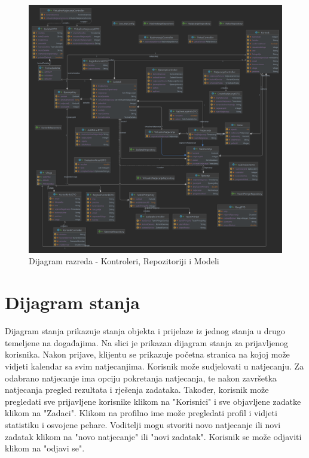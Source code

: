 \begin{figure}[H]
	\includegraphics[scale=0.15]{dijagrami/apiDiagram.png}
	\centering
	\caption{Dijagram razreda - Kontroleri, Repozitoriji i Modeli}
	\label{fig:dijagramRazreda2}
\end{figure}

%
%
%
%
\eject
%
\section{Dijagram stanja}


%

Dijagram stanja prikazuje stanja objekta i prijelaze iz jednog stanja u drugo temeljene na događajima. Na slici je prikazan dijagram stanja za prijavljenog korisnika. Nakon prijave, klijentu se prikazuje početna stranica na kojoj može vidjeti kalendar sa svim natjecanjima. Korisnik može sudjelovati u natjecanju. Za odabrano natjecanje ima opciju pokretanja natjecanja, te nakon završetka natjecanja pregled rezultata i rješenja zadataka. Također, korisnik može pregledati sve prijavljene korisnike klikom na "Korisnici" i sve objavljene zadatke klikom na "Zadaci". Klikom na profilno ime može pregledati  profil i vidjeti  statistiku i osvojene pehare. Voditelji mogu stvoriti novo natjecanje ili novi zadatak klikom na "novo natjecanje" ili "novi zadatak". Korisnik se može odjaviti klikom na "odjavi se".

